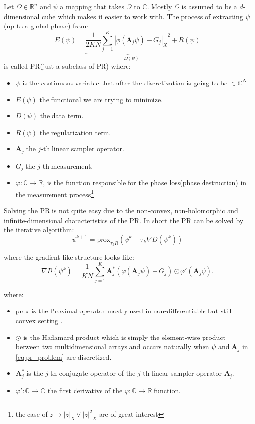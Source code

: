 Let $\Omega \in \mathbb{R}^n$ and $\psi$ a mapping that takes $\Omega$ to $\mathbb{C}$. Mostly $\Omega$ is assumed to be a 
$d$-dimensional cube which makes it easier to work with. The process of extracting $\psi$(up to a global phase) from:
\begin{equation}\label{eq:pr_problem}
	E(\psi) = \underbrace{\frac{1}{2KN} \sum_{j=1}^{K} {\left|\phi(\boldsymbol{A}_j\psi)-G_j\right|_X}^2}_{\coloneqq D(\psi)}+ R(\psi)
  \end{equation}
  is called \acl*{PR}(just a subclass of \acl*{PR}) where:
  \begin{itemize}
  \item $\psi$ is the continuous variable that after the discretization is going to be $\in \mathbb{C}^N$
	\item $E(\psi)$ the functional we are trying to minimize.
	\item $D(\psi)$ the data term.
	\item $R(\psi)$ the regularization term.
	\item $\boldsymbol{A}_j$ the $j$-th linear sampler operator.
	\item $G_j$ the $j$-th measurement.
	\item $\varphi \colon \mathbb{C} \rightarrow \mathbb{R}$, 
	is the function responsible for the phase loss(phase destruction) in the measurement process\footnote{the case of $z \rightarrow \left|z\right|_X \lor {\left|z\right|^2}_X$ are of great interest}
  \end{itemize}

Solving the \acl*{PR} is not quite easy due to the non-convex, non-holomorphic and infinite-dimensional characteristics of the \acl*{PR}. 
In short the \acl*{PR} can be solved by the iterative algorithm:
  \begin{equation}\label{eq:pr_solution}
	\psi^{k+1} = \text{prox}_{\tau_{k}R}(\psi^k-\tau_k\nabla{D(\psi^k)})
  \end{equation}

  where the gradient-like structure looks like: 
  \begin{equation}\label{eq:gradient_pr_solution}
	\nabla{D(\psi^k)} = \frac{1}{KN} \sum_{j=1}^{K} \boldsymbol{A}_j^*\left(\varphi\left(\boldsymbol{A}_j\psi\right)-G_j\right)\odot \varphi'(\boldsymbol{A}_j\psi).
  \end{equation}

  where:
  \begin{itemize}
	\item $\mathrm{prox}$ is the Proximal operator mostly used in non-differentiable but still convex setting \cite{Bredies2018}.
	\item $\odot$ is the Hadamard product\cite{Hackbusch2019} which is simply the element-wise product between two multidimensional arrays and occurs naturally when $\psi$ and $\boldsymbol{A}_j$ in \cref{eq:pr_problem} are discretized.
	\item $\boldsymbol{A}^*_j$ is the $j$-th conjugate operator of the $j$-th linear sampler operator $\boldsymbol{A}_j$.
	\item $\varphi' \colon \mathbb{C} \to \mathbb{C}$ the first derivative of the $\varphi \colon \mathbb{C} \to \mathbb{R}$ function.
  \end{itemize}

